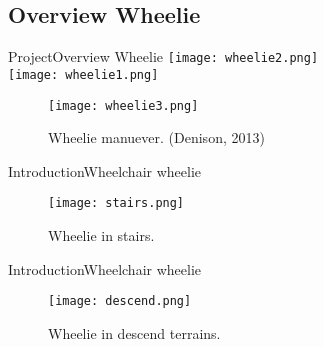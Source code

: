 \documentclass[10pt]{beamer}
\begin{document}
\subsection{Overview Wheelie}
\begin{frame}{Project}{Overview Wheelie}
\centering
\texttt{[image: wheelie2.png]} \\
\texttt{[image: wheelie1.png]} \\ 
\begin{figure}
\texttt{[image: wheelie3.png]}
\caption{Wheelie manuever. (Denison, 2013)}
\end{figure}
\end{frame}
\begin{frame}{Introduction}{Wheelchair wheelie}
\begin{figure}
\centering
\texttt{[image: stairs.png]}
\caption{Wheelie in stairs.}
\end{figure}
\end{frame}
\begin{frame}{Introduction}{Wheelchair wheelie}
\begin{figure}
\centering
\texttt{[image: descend.png]}
\caption{Wheelie in descend terrains.}
\end{figure}
\end{frame}
\end{document}
